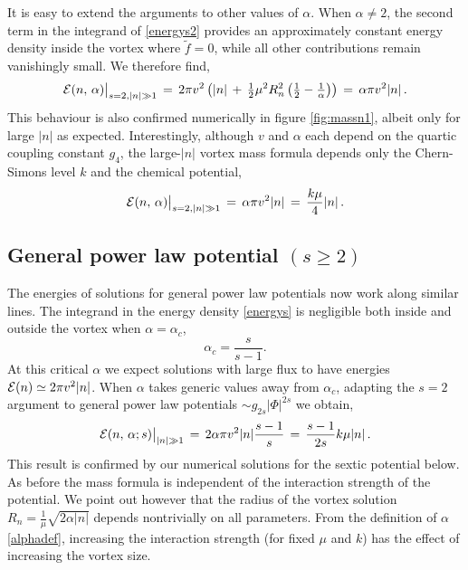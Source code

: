 \documentclass[12pt,a4paper]{article}
\def\be{\begin{equation}}
\def\ee{\end{equation}}
\begin{document}
It is easy to extend the arguments to  other values of $\alpha$. When $\alpha\neq 2$, the second term in the integrand of \eqref{energys2} provides an approximately constant energy density inside the vortex where $\tilde f=0$, while all other contributions remain vanishingly small. We therefore find,
\be
{\cal E}(n, \,\alpha)\big|_{s=2, |n|\gg1}\,=\, 2\pi v^2 \left(|n|\,+\,\tfrac12 \mu^2R_n^2\left(\tfrac12-\tfrac{1}{\alpha}\right) \right)\,=\,\alpha\pi v^2|n|\,.
\ee
This behaviour is also confirmed numerically in figure \ref{fig:massn1}, albeit only for large $|n|$ as expected. Interestingly, although $v$ and $\alpha$ each  depend on the quartic coupling constant $g_4$, the large-$|n|$ vortex mass formula depends only the Chern-Simons level $k$ and the chemical potential,
\be
{\cal E}(n,\,\alpha)\big|_{s=2, |n|\gg1}\,=\,\alpha\pi v^2|n|\,=\, \frac{k\mu}{4}|n|\,.
\ee

\subsection{General power law potential $(s\geq 2)$}
 The energies of solutions for general power law potentials now work along similar lines.  The integrand in the energy density \eqref{energys} is negligible both inside and outside the vortex when $\alpha=\alpha_c$,
 \be
 \alpha_c= \frac{s}{s-1}.
 \ee 
 At this critical  $\alpha$ we expect solutions with large flux to have energies ${\cal E}(n)\simeq 2\pi v^2 |n|$. When $\alpha$ takes generic values away from  $\alpha_c$, adapting the $s=2$ argument to general power law potentials $\sim g_{2s}|\Phi|^{2s}$  we obtain,
 \be
 {\cal E}(n, \,\alpha; s)\big|_{|n|\gg 1}\,=\,2\alpha\pi v^2|n|\frac{s-1}{s}\,=\,\frac{s-1}{2s}k\mu|n|\,.\label{generalenergy}
 \ee
This result is confirmed by our numerical solutions for the sextic potential below. As before the mass formula is independent of the interaction strength of the potential. We point out however that the radius of the vortex solution $R_n=\frac{1}{\mu}\sqrt{2\alpha |n|}$ depends nontrivially on all parameters. From the definition of $\alpha$ \eqref{alphadef}, increasing the interaction strength (for fixed $\mu$ and $k$) has the effect of increasing the vortex size.
\end{document}
